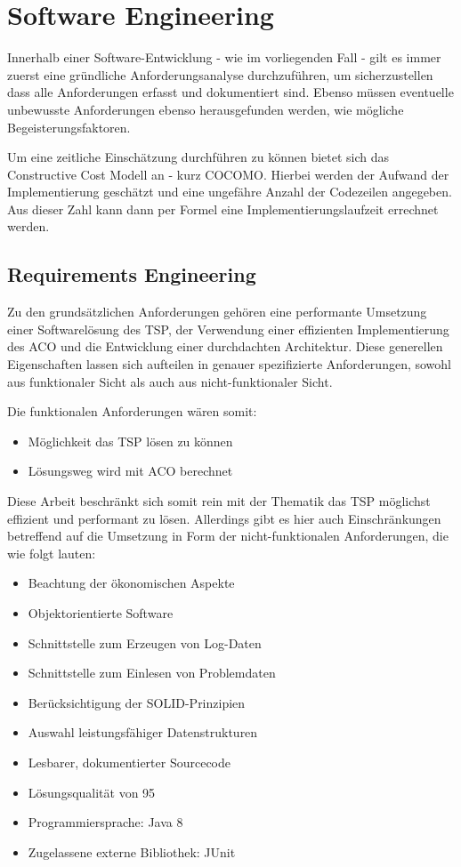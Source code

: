 \section{Software Engineering}{
Innerhalb einer Software-Entwicklung - wie im vorliegenden Fall - gilt es immer zuerst eine gründliche Anforderungsanalyse durchzuführen, um sicherzustellen dass alle Anforderungen erfasst und dokumentiert sind. Ebenso müssen eventuelle unbewusste Anforderungen ebenso herausgefunden werden, wie mögliche Begeisterungsfaktoren.

Um eine zeitliche Einschätzung durchführen zu können bietet sich das Constructive Cost Modell an - kurz COCOMO. Hierbei werden der Aufwand der Implementierung geschätzt und eine ungefähre Anzahl der Codezeilen angegeben. Aus dieser Zahl kann dann per Formel eine Implementierungslaufzeit errechnet werden. 

	\subsection{Requirements Engineering}
	Zu den grundsätzlichen Anforderungen gehören eine performante Umsetzung einer Softwarelösung des \ac{TSP}, der Verwendung einer effizienten Implementierung des \ac{ACO} und die Entwicklung einer durchdachten Architektur.
	Diese generellen Eigenschaften lassen sich aufteilen in genauer spezifizierte Anforderungen, sowohl aus funktionaler Sicht als auch aus nicht-funktionaler Sicht.
	
	Die funktionalen Anforderungen wären somit:
	\begin{itemize}
		\item Möglichkeit das \ac{TSP} lösen zu können
		\item Lösungsweg wird mit \ac{ACO} berechnet
	\end{itemize}
	Diese Arbeit beschränkt sich somit rein mit der Thematik das TSP möglichst effizient und performant zu lösen. Allerdings gibt es hier auch Einschränkungen betreffend auf die Umsetzung in Form der nicht-funktionalen Anforderungen, die wie folgt lauten:		
	\begin{itemize}
		\item Beachtung der ökonomischen Aspekte
		\item Objektorientierte Software
		\item Schnittstelle zum Erzeugen von Log-Daten
		\item Schnittstelle zum Einlesen von Problemdaten
		\item Berücksichtigung der SOLID-Prinzipien
		\item Auswahl leistungsfähiger Datenstrukturen
		\item Lesbarer, dokumentierter Sourcecode
		\item Lösungsqualität von 95%
		\item Programmiersprache: Java 8
		\item Zugelassene externe Bibliothek: JUnit
	\end{itemize}
	
}
